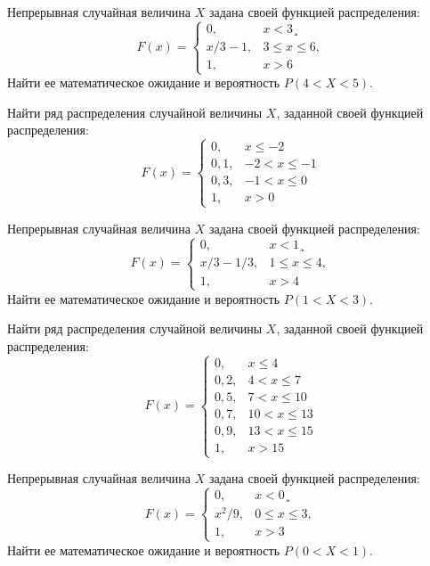 \vfill

\z Непрерывная случайная величина $X$ задана своей функцией распределения: $$ F(x) = \begin{cases}0, & x < 3¸\\ x/3-1, & 3 \leqslant x \leqslant 6, \\ 1, & x > 6 \end{cases} $$ Найти ее математическое ожидание и вероятность $P(4 < X < 5)$.
 

\vfill

\newpage\setcounter{zad}{0}

\z Найти ряд распределения случайной величины $X$, заданной своей функцией распределения: $$ F(x) = \begin{cases}0, & x \leqslant -2 \\ 0{,}1, & -2 < x \leqslant -1 \\ 0{,}3, & -1 < x \leqslant 0 \\ 1, & x > 0 \end{cases} $$


\vfill

\z Непрерывная случайная величина $X$ задана своей функцией распределения: $$ F(x) = \begin{cases}0, & x < 1¸\\ x/3-1/3, & 1 \leqslant x \leqslant 4, \\ 1, & x > 4 \end{cases} $$ Найти ее математическое ожидание и вероятность $P(1 < X < 3)$.
 

\vfill

\newpage\setcounter{zad}{0}

\z Найти ряд распределения случайной величины $X$, заданной своей функцией распределения: $$ F(x) = \begin{cases}0, & x \leqslant 4 \\ 0{,}2, & 4 < x \leqslant 7 \\ 0{,}5, & 7 < x \leqslant 10 \\ 0{,}7, & 10 < x \leqslant 13 \\ 0{,}9, & 13 < x \leqslant 15 \\ 1, & x > 15 \end{cases} $$


\vfill

\z Непрерывная случайная величина $X$ задана своей функцией распределения: $$ F(x) = \begin{cases}0, & x < 0¸\\ x^2/9, & 0 \leqslant x \leqslant 3, \\ 1, & x > 3 \end{cases} $$ Найти ее математическое ожидание и вероятность $P(0 < X < 1)$.
 

